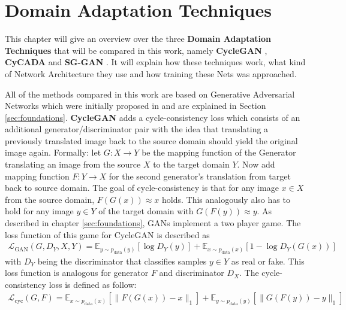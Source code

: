 \chapter{Domain Adaptation Techniques}
\label{sec:techniques}

This chapter will give an overview over the three \textbf{Domain Adaptation Techniques} that will be compared in this work, namely \textbf{CycleGAN} \cite{DBLP:journals/corr/ZhuPIE17}, \textbf{CyCADA} \cite{DBLP:journals/corr/abs-1711-03213} and \textbf{SG-GAN} \cite{DBLP:journals/corr/abs-1801-01726}. It will explain how these techniques work, what kind of Network Architecture they use and how training these Nets was approached.

All of the methods compared in this work are based on Generative Adversarial Networks which were initially proposed in \cite{NIPS2014_5423} and are explained in Section \ref{sec:foundations}. \textbf{CycleGAN} \cite{DBLP:journals/corr/ZhuPIE17} adds a cycle-consistency loss which consists of an additional generator/discriminator pair with the idea that translating a previously translated image back to the source domain should yield the original image again. Formally: let $G: X \rightarrow Y$ be the mapping function of the Generator translating an image from the source $X$ to the target domain $Y$. Now add mapping function $F: Y \rightarrow X$ for the second generator's translation from target back to source domain. The goal of cycle-consistency is that for any image $x\in X$ from the source domain, $F(G(x)) \approx x$ holds. This analogously also has to hold for any image $y \in Y$ of the target domain with $G(F(y)) \approx y$. As described in chapter \ref{sec:foundations}, GANs implement a two player game. The loss function of this game for CycleGAN is described as
\begin{align}
	\mathcal{L}_{\text{GAN}}(G, D_Y, X, Y) = \mathbb{E}_{y\sim p_{\text{data}}(y)}[\log D_Y(y)] + \mathbb{E}_{x\sim p_{\text{data}}(x)}[1 - \log D_Y(G(x))]
\end{align}
with $D_Y$ being the discriminator that classifies samples $y \in Y$ as real or fake. This loss function is analogous for generator $F$ and discriminator $D_X$. The cycle-consistency loss is defined as follow:
\begin{align}
	\mathcal{L}_{\text{cyc}}(G, F) =  \mathbb{E}_{x\sim p_{\text{data}}(x)} [\lVert F(G(x))- x \rVert_1] + \mathbb{E}_{y\sim p_{\text{data}}(y)} [\lVert G(F(y))- y \rVert_1] \label{GAN_loss}
\end{align}\\
